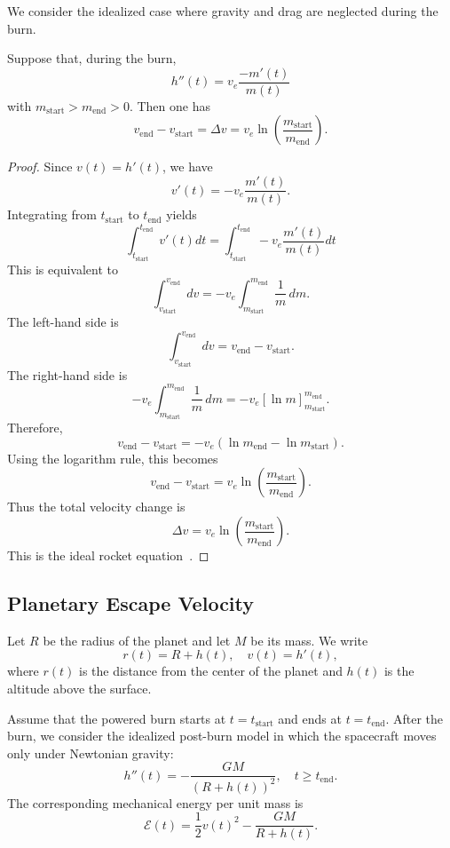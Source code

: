 ﻿\documentclass[12pt]{article}
\begin{document}
We consider the idealized case where gravity and drag are neglected during the burn.
\begin{lemma}
    Suppose that, during the burn,
    \[
 h''(t)
 =
 v_e\frac{-m'(t)}{m(t)}
 \]
    with $m_{\mathrm{start}} > m_{\mathrm{end}} > 0$. Then one has 
    \[
 v_{\mathrm{end}} - v_{\mathrm{start}} = \Delta v
 =
 v_e\ln\left(\frac{m_{\mathrm{start}}}{m_{\mathrm{end}}}\right).\]
\end{lemma}
\begin{proof}
Since $v(t) = h'(t)$, we have
\[
 v'(t) = -v_e\frac{m'(t)}{m(t)}.
\]
Integrating from $t_{\mathrm{start}}$ to $t_{\mathrm{end}}$ yields
\[ \int_{t_{\mathrm{start}}}^{t_{\mathrm{end}}}v'(t)dt = \int_{t_{\mathrm{start}}}^{t_{\mathrm{end}}} - v_e\frac{m'(t)}{m(t)}dt
\]
This is equivalent to
\[ \int_{v_{\mathrm{start}}}^{v_{\mathrm{end}}}dv = -v_e \int_{m_{\mathrm{start}}}^{m_{\mathrm{end}}}\frac{1}{m}\, dm.
\]
The left-hand side is
\[ \int_{v_{\mathrm{start}}}^{v_{\mathrm{end}}}dv = v_{\mathrm{end}} - v_{\mathrm{start}}.
\]
The right-hand side is
\[
 -v_e \int_{m_{\mathrm{start}}}^{m_{\mathrm{end}}}\frac{1}{m}\, dm = -v_e \left[\ln m\right]_{m_{\mathrm{start}}}^{m_{\mathrm{end}}}.
\]
Therefore,
\[
 v_{\mathrm{end}} - v_{\mathrm{start}} = -v_e(\ln m_{\mathrm{end}} - \ln m_{\mathrm{start}}).
\]
Using the logarithm rule, this becomes
\[
 v_{\mathrm{end}} - v_{\mathrm{start}} = v_e\ln\left(\frac{m_{\mathrm{start}}}{m_{\mathrm{end}}}\right).
\]
Thus the total velocity change is
\[
 \boxed{ \Delta v = v_e\ln\left(\frac{m_{\mathrm{start}}}{m_{\mathrm{end}}}\right). }
\]
This is the ideal rocket equation~\cite{nasa_glenn_ideal_rocket_equation}. 
    
\end{proof}
\subsection{Planetary Escape Velocity}

Let $R$ be the radius of the planet and let $M$ be its mass. 
We write
\[
 r(t) = R + h(t),\quad v(t) = h'(t),
\]
where $r(t)$ is the distance from the center of the planet and $h(t)$ is the altitude above the surface.

Assume that the powered burn starts at $t = t_{\mathrm{start}}$ and ends at $t = t_{\mathrm{end}}$. 
After the burn, we consider the idealized post-burn model in which the spacecraft moves only under Newtonian gravity:
\[
 h''(t) = -\frac{GM}{(R + h(t))^2},
 \quad t\ge t_{\mathrm{end}}.
\]
The corresponding mechanical energy per unit mass is
\[
 \mathcal E(t)
 =
 \frac{1}{2}v(t)^2 - \frac{GM}{R + h(t)}.
\]
\end{document}

